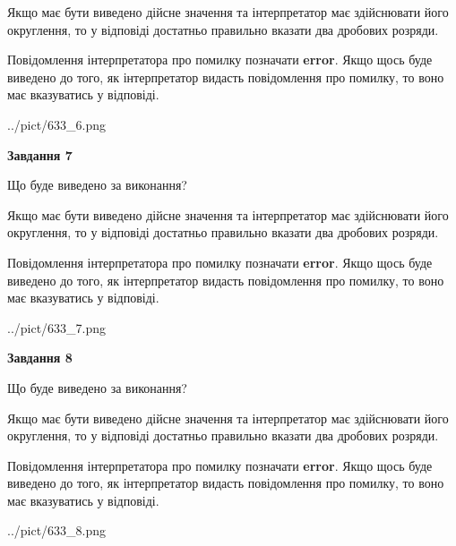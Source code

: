 \documentclass[12pt, ukrainian]{article}
\begin{document}
{\begin {Large}
Якщо має бути виведено дійсне значення та інтерпретатор має здійснювати його округлення, 
то у відповіді достатньо правильно вказати два дробових розряди.

Повідомлення інтерпретатора про помилку позначати \textbf{error}.
Якщо щось буде виведено до того, як інтерпретатор видасть повідомлення про помилку, 
то воно має вказуватись у відповіді. \par

\begin{center}
	{../pict/633_6.png}
\end{center}
\newpage

{\begin {center}\textbf{Завдання 7}\end {center}}\par
Що буде виведено за виконання? \par

Якщо має бути виведено дійсне значення та інтерпретатор має здійснювати його округлення, 
то у відповіді достатньо правильно вказати два дробових розряди.

Повідомлення інтерпретатора про помилку позначати \textbf{error}.
Якщо щось буде виведено до того, як інтерпретатор видасть повідомлення про помилку, 
то воно має вказуватись у відповіді. \par

\begin{center}
	{../pict/633_7.png}
\end{center}
\newpage

{\begin {center}\textbf{Завдання 8}\end {center}}\par
Що буде виведено за виконання? \par

Якщо має бути виведено дійсне значення та інтерпретатор має здійснювати його округлення, 
то у відповіді достатньо правильно вказати два дробових розряди.

Повідомлення інтерпретатора про помилку позначати \textbf{error}.
Якщо щось буде виведено до того, як інтерпретатор видасть повідомлення про помилку, 
то воно має вказуватись у відповіді. \par

\begin{center}
	{../pict/633_8.png}
\end{center}
\newpage


\end{Large}}
\end{document}
